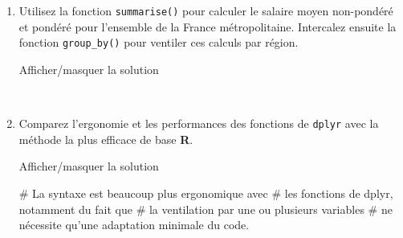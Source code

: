 \documentclass[12pt,]{article}
\newenvironment{Shaded}{}{}
\newcommand{\KeywordTok}[1]{\textcolor[rgb]{0.00,0.00,1.00}{{#1}}}
\newcommand{\DataTypeTok}[1]{{#1}}
\newcommand{\StringTok}[1]{\textcolor[rgb]{0.00,0.50,0.50}{{#1}}}
\newcommand{\CommentTok}[1]{\textcolor[rgb]{0.00,0.50,0.00}{{#1}}}
\newcommand{\OtherTok}[1]{\textcolor[rgb]{1.00,0.25,0.00}{{#1}}}
\newcommand{\NormalTok}[1]{{#1}}
\begin{document}
\begin{enumerate}
\def\labelenumi{\alph{enumi}.}
\item
  Utilisez la fonction \texttt{summarise()} pour calculer le salaire
  moyen non-pondéré et pondéré pour l'ensemble de la France
  métropolitaine. Intercalez ensuite la fonction \texttt{group\_by()}
  pour ventiler ces calculs par région.

  Afficher/masquer la solution

  \hypertarget{sol53}{}
\begin{Shaded}
\end{Shaded}

  ~
\item
  Comparez l'ergonomie et les performances des fonctions de
  \texttt{dplyr} avec la méthode la plus efficace de base \textbf{R}.

  Afficher/masquer la solution

  \hypertarget{sol54}{}
\begin{Shaded}
\begin{Highlighting}[]
\CommentTok{# La syntaxe est beaucoup plus ergonomique avec}
\CommentTok{# les fonctions de dplyr, notamment du fait que}
\CommentTok{# la ventilation par une ou plusieurs variables}
\CommentTok{# ne nécessite qu'une adaptation minimale du code.}


\end{Highlighting}
\end{Shaded}
\end{enumerate}
\end{document}

